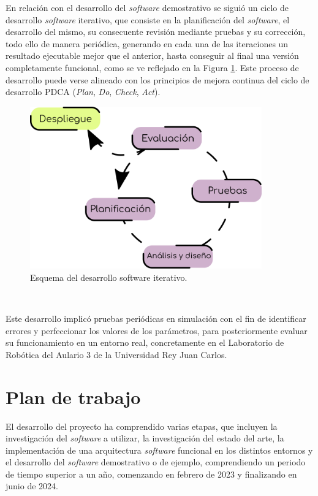 En relación con el desarrollo del \textit{software} demostrativo se siguió un
ciclo de desarrollo \textit{software} iterativo, que consiste en la
planificación del \textit{software}, el desarrollo del mismo, su consecuente
revisión mediante pruebas y su corrección, todo ello de manera periódica,
generando en cada una de las iteraciones un resultado ejecutable mejor que el
anterior, hasta conseguir al final una versión completamente funcional, como se
ve reflejado en la Figura \ref{fig:desarrollo_iterativo}.
Este proceso de desarrollo puede verse alineado con los principios de mejora
continua del ciclo de desarrollo PDCA (\textit{Plan}, \textit{Do},
\textit{Check}, \textit{Act}).

\begin{figure} [h!]
  \begin{center}
    \includegraphics[width=10cm]{figs/desarrollo_iterativo}
  \end{center}
  \caption{Esquema del desarrollo software iterativo.}
  \label{fig:desarrollo_iterativo}
\end{figure}\

Este desarrollo implicó pruebas periódicas en simulación con el fin de
identificar errores y perfeccionar los valores de los parámetros, para
posteriormente evaluar su funcionamiento en un entorno real, concretamente en el
Laboratorio de Robótica del Aulario 3 de la Universidad Rey Juan Carlos.


\section{Plan de trabajo}
\label{sec:plantrabajo}

El desarrollo del proyecto ha comprendido varias etapas, que incluyen la
investigación del \textit{software} a utilizar, la investigación del estado del
arte, la implementación de una arquitectura \textit{software} funcional en los
distintos entornos y el desarrollo del \textit{software} demostrativo o de
ejemplo, comprendiendo un periodo de tiempo superior a un año, comenzando en
febrero de 2023 y finalizando en junio de 2024.

